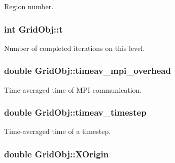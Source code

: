 Region number. 

\subsubsection[{\texorpdfstring{t}{t}}]{\setlength{\rightskip}{0pt plus 5cm}int Grid\+Obj\+::t}\hypertarget{class_grid_obj_a783b18a053e244ae7b7b436ab21c0592}{}\label{class_grid_obj_a783b18a053e244ae7b7b436ab21c0592}


Number of completed iterations on this level. 

\subsubsection[{\texorpdfstring{timeav\+\_\+mpi\+\_\+overhead}{timeav_mpi_overhead}}]{\setlength{\rightskip}{0pt plus 5cm}double Grid\+Obj\+::timeav\+\_\+mpi\+\_\+overhead}\hypertarget{class_grid_obj_a147cfb80b653ca4432432e8185cf38ef}{}\label{class_grid_obj_a147cfb80b653ca4432432e8185cf38ef}


Time-\/averaged time of M\+PI communication. 

\subsubsection[{\texorpdfstring{timeav\+\_\+timestep}{timeav_timestep}}]{\setlength{\rightskip}{0pt plus 5cm}double Grid\+Obj\+::timeav\+\_\+timestep}\hypertarget{class_grid_obj_a2ad670e6b9bdd28b5060397800170310}{}\label{class_grid_obj_a2ad670e6b9bdd28b5060397800170310}


Time-\/averaged time of a timestep. 

\subsubsection[{\texorpdfstring{X\+Origin}{XOrigin}}]{\setlength{\rightskip}{0pt plus 5cm}double Grid\+Obj\+::\+X\+Origin}\hypertarget{class_grid_obj_adcd2bcbd5bb4009d7c84097e1356a1fa}{}\label{class_grid_obj_adcd2bcbd5bb4009d7c84097e1356a1fa}


